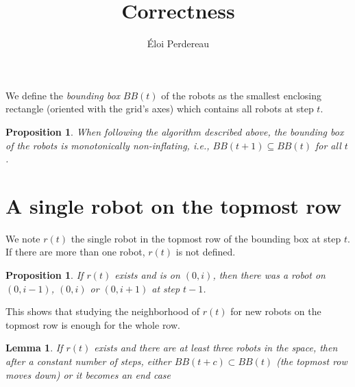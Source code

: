 \documentclass[11pt, a4paper]{article}
\title{Correctness}
\author{\'Eloi Perdereau}
\theoremstyle{plain}
\newtheorem{lem}[thm]{Lemma}
\newtheorem{prop}[thm]{Proposition}
\theoremstyle{definition}
\theoremstyle{remark}
\begin{document}
\maketitle

We define the \textit{bounding box} $BB(t)$ of the robots as the smallest
enclosing rectangle (oriented with the grid's axes) which contains all robots
at step $t$.

\begin{prop}
When following the algorithm described above, the bounding box of the robots is
monotonically non-inflating, i.e., $BB(t+1) \subseteq BB(t)$ for all $t$.
\end{prop}

\section{A single robot on the topmost row}

We note $r(t)$ the single robot in the topmost row of the bounding box at step
$t$. If there are more than one robot, $r(t)$ is not defined.

\begin{prop}
If $r(t)$ exists and is on $(0,i)$, then there was a robot on $(0,i-1)$, $(0,i)$
or $(0,i+1)$ at step $t-1$.
\end{prop}

This shows that studying the neighborhood of $r(t)$ for new robots on the
topmost row is enough for the whole row.

\begin{lem}
If $r(t)$ exists and there are at least three robots in the space, then after a
constant number of steps, either $BB(t+c) \subset BB(t)$ (the topmost row moves
down) or it becomes an end case
\end{lem}
\end{document}
